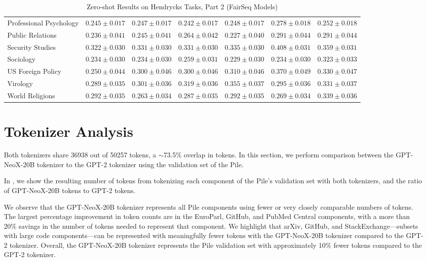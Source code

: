 \documentclass[11pt]{article}
\newcommand{\model}{GPT-NeoX-20B}
\begin{document}
{\begin{landscape}
\begin{table}
\begin{tabular}{l c c c c c c }
Professional Psychology & $0.245 \pm 0.017$ & $0.247 \pm 0.017$ & $0.242 \pm 0.017$ & $0.248 \pm 0.017$ & $0.278 \pm 0.018$ & $0.252 \pm 0.018$ \\ 
Public Relations & $0.236 \pm 0.041$ & $0.245 \pm 0.041$ & $0.264 \pm 0.042$ & $0.227 \pm 0.040$ & $0.291 \pm 0.044$ & $0.291 \pm 0.044$ \\ 
Security Studies & $0.322 \pm 0.030$ & $0.331 \pm 0.030$ & $0.331 \pm 0.030$ & $0.335 \pm 0.030$ & $0.408 \pm 0.031$ & $0.359 \pm 0.031$ \\ 
Sociology & $0.234 \pm 0.030$ & $0.234 \pm 0.030$ & $0.259 \pm 0.031$ & $0.229 \pm 0.030$ & $0.234 \pm 0.030$ & $0.323 \pm 0.033$ \\ 
US Foreign Policy & $0.250 \pm 0.044$ & $0.300 \pm 0.046$ & $0.300 \pm 0.046$ & $0.310 \pm 0.046$ & $0.370 \pm 0.049$ & $0.330 \pm 0.047$ \\ 
Virology & $0.289 \pm 0.035$ & $0.301 \pm 0.036$ & $0.319 \pm 0.036$ & $0.355 \pm 0.037$ & $0.295 \pm 0.036$ & $0.331 \pm 0.037$ \\ 
World Religions & $0.292 \pm 0.035$ & $0.263 \pm 0.034$ & $0.287 \pm 0.035$ & $0.292 \pm 0.035$ & $0.269 \pm 0.034$ & $0.339 \pm 0.036$ \\ 
\bottomrule
\end{tabular}
\caption{Zero-shot Results on Hendrycks Tasks, Part 2 (FairSeq Models)}
\label{tab:hendrycks-fair2}
\end{table}
\end{landscape}}

\clearpage

\section{Tokenizer Analysis}\label{sec:tokenizer-analysis}

Both tokenizers share 36938 out of 50257 tokens, a $\sim$73.5\% overlap in tokens.
In this section, we perform comparison between the \model{} tokenizer to the GPT-2 tokenizer using the validation set of the Pile.

In , we show the resulting number of tokens from tokenizing each component of the Pile’s validation set with both tokenizers, and the ratio of \model{} tokens to GPT-2 tokens.

We observe that the \model{} tokenizer represents all Pile components using fewer or very closely comparable numbers of tokens. The largest percentage improvement in token counts are in the EuroParl, GitHub, and PubMed Central components, with a more than 20\% savings in the number of tokens needed to represent that component. We highlight that arXiv, GitHub, and StackExchange---subsets with large code components---can be represented with meaningfully fewer tokens with the \model{} tokenizer compared to the GPT-2 tokenizer. Overall, the \model{} tokenizer represents the Pile validation set with approximately 10\% fewer tokens compared to the GPT-2 tokenizer.
\end{document}
